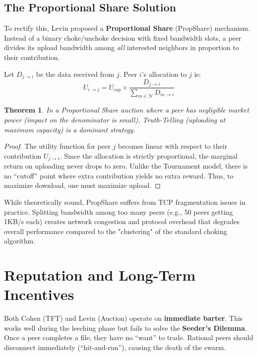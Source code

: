 \documentclass[12pt]{article}
\newtheorem{theorem}{Theorem}
\begin{document}
\subsection{The Proportional Share Solution}
To rectify this, Levin proposed a \textbf{Proportional Share} (PropShare) mechanism. Instead of a binary choke/unchoke decision with fixed bandwidth slots, a peer divides its upload bandwidth among \textit{all} interested neighbors in proportion to their contribution.

Let $D_{j \to i}$ be the data received from $j$. Peer $i$'s allocation to $j$ is:
\begin{equation}
U_{i \to j} = U_{cap} \times \frac{D_{j \to i}}{\sum_{m \in \mathcal{N}} D_{m \to i}}
\end{equation}

\begin{theorem}
In a Proportional Share auction where a peer has negligible market power (impact on the denominator is small), Truth-Telling (uploading at maximum capacity) is a dominant strategy.
\end{theorem}

\begin{proof}
The utility function for peer $j$ becomes linear with respect to their contribution $U_{j \to i}$. Since the allocation is strictly proportional, the marginal return on uploading never drops to zero. Unlike the Tournament model, there is no ``cutoff'' point where extra contribution yields no extra reward. Thus, to maximize download, one must maximize upload.
\end{proof}

While theoretically sound, PropShare suffers from TCP fragmentation issues in practice. Splitting bandwidth among too many peers (e.g., 50 peers getting 1KB/s each) creates network congestion and protocol overhead that degrades overall performance compared to the "clustering" of the standard choking algorithm.

\section{Reputation and Long-Term Incentives}

Both Cohen (TFT) and Levin (Auction) operate on \textbf{immediate barter}. This works well during the leeching phase but fails to solve the \textbf{Seeder's Dilemma}. Once a peer completes a file, they have no ``want'' to trade. Rational peers should disconnect immediately (``hit-and-run''), causing the death of the swarm.
\end{document}
